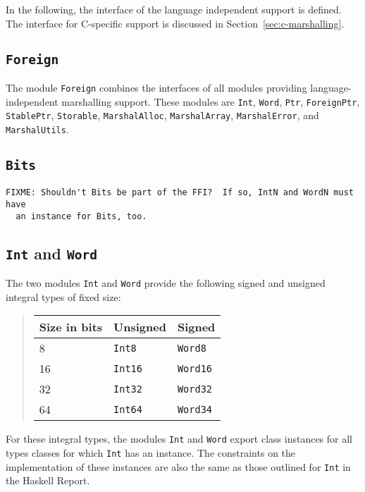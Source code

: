 \documentclass[a4paper,twosides]{article}
\newcommand{\code}[1]{\texttt{#1}}      %
\begin{document}
In the following, the interface of the language independent support is
defined.  The interface for C-specific support is discussed in
Section~\ref{sec:c-marshalling}. 

\subsection{\code{Foreign}}

The module \code{Foreign} combines the interfaces of all modules providing
language-independent marshalling support.  These modules are \code{Int},
\code{Word}, \code{Ptr}, \code{ForeignPtr}, \code{StablePtr}, \code{Storable},
\code{MarshalAlloc}, \code{MarshalArray}, \code{MarshalError}, and
\code{MarshalUtils}.

\subsection{\code{Bits}}

\begin{verbatim}
FIXME: Shouldn't Bits be part of the FFI?  If so, IntN and WordN must have
  an instance for Bits, too.
\end{verbatim}

\subsection{\code{Int} and \code{Word}}
\label{sec:Int-Word}

The two modules \code{Int} and \code{Word} provide the following signed and
unsigned integral types of fixed size:
%
\begin{quote}
  \begin{tabular}{|l|l|l|}
    \hline
    Size in bits & Unsigned     & Signed\\\hline\hline
    8            & \code{Int8}  & \code{Word8}\\
    16           & \code{Int16} & \code{Word16}\\
    32           & \code{Int32} & \code{Word32}\\
    64           & \code{Int64} & \code{Word34}\\
    \hline
  \end{tabular}
\end{quote}
%
For these integral types, the modules \code{Int} and \code{Word} export class
instances for all types classes for which \code{Int} has an instance.  The
constraints on the implementation of these instances are also the same as
those outlined for \code{Int} in the Haskell Report.
\end{document}
